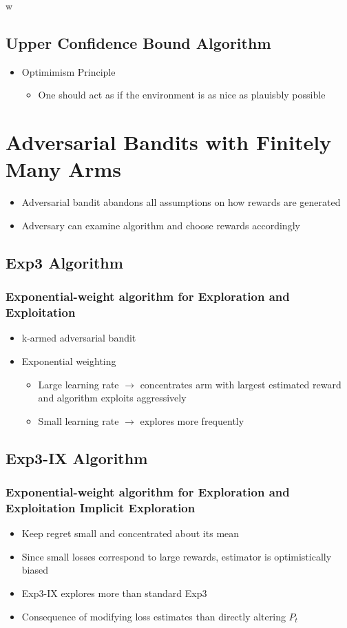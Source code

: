 w\documentclass{article}
\begin{document}
\subsection{Upper Confidence Bound Algorithm}
\begin{itemize}
	\item Optimimism Principle
	\begin{itemize}
		\item One should act as if the environment is as nice as plauisbly possible
	\end{itemize}
\end{itemize}

\section{Adversarial Bandits with Finitely Many Arms}
\begin{itemize}
	\item Adversarial bandit abandons all assumptions on how rewards are generated
	\item Adversary can examine algorithm and choose rewards accordingly
\end{itemize}
\subsection{Exp3 Algorithm}
\subsubsection{Exponential-weight algorithm for Exploration and Exploitation}
\begin{itemize}
	\item k-armed adversarial bandit
	\item Exponential weighting
	\begin{itemize}
		\item Large learning rate $\rightarrow$ concentrates arm with largest estimated reward and algorithm exploits aggressively
		\item Small learning rate $\rightarrow$ explores more frequently
	\end{itemize}
\end{itemize}
\subsection{Exp3-IX Algorithm}
\subsubsection{Exponential-weight algorithm for Exploration and Exploitation Implicit Exploration}
\begin{itemize}
	\item Keep regret small and concentrated about its mean
	\item Since small losses correspond to large rewards, estimator is optimistically biased
	\item Exp3-IX explores more than standard Exp3
	\item Consequence of modifying loss estimates than directly altering $P_{t}$
\end{itemize}
\end{document}
